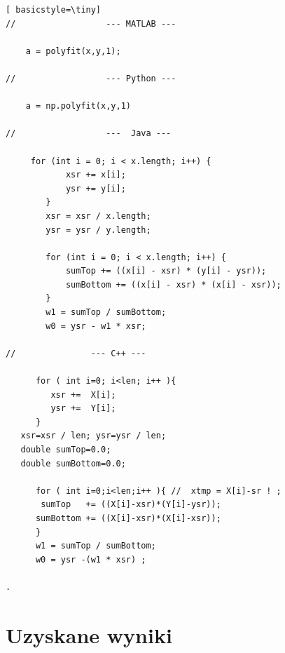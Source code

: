 \begin{lstlisting}[ basicstyle=\tiny]
//                  --- MATLAB ---

    a = polyfit(x,y,1);

//                  --- Python --- 

    a = np.polyfit(x,y,1)

//                  ---  Java --- 

     for (int i = 0; i < x.length; i++) {
            xsr += x[i];
            ysr += y[i];
        }
        xsr = xsr / x.length;
        ysr = ysr / y.length;

        for (int i = 0; i < x.length; i++) {
            sumTop += ((x[i] - xsr) * (y[i] - ysr));
            sumBottom += ((x[i] - xsr) * (x[i] - xsr));
        }
        w1 = sumTop / sumBottom;
        w0 = ysr - w1 * xsr;

//               --- C++ ---

      for ( int i=0; i<len; i++ ){
         xsr +=  X[i];
         ysr +=  Y[i];
      }
   xsr=xsr / len; ysr=ysr / len;
   double sumTop=0.0;
   double sumBottom=0.0;

      for ( int i=0;i<len;i++ ){ //  xtmp = X[i]-sr ! ;
       sumTop   += ((X[i]-xsr)*(Y[i]-ysr));
      sumBottom += ((X[i]-xsr)*(X[i]-xsr));
      }
      w1 = sumTop / sumBottom;
      w0 = ysr -(w1 * xsr) ;
        
.   
\end{lstlisting}

\newpage
\section{Uzyskane wyniki}

